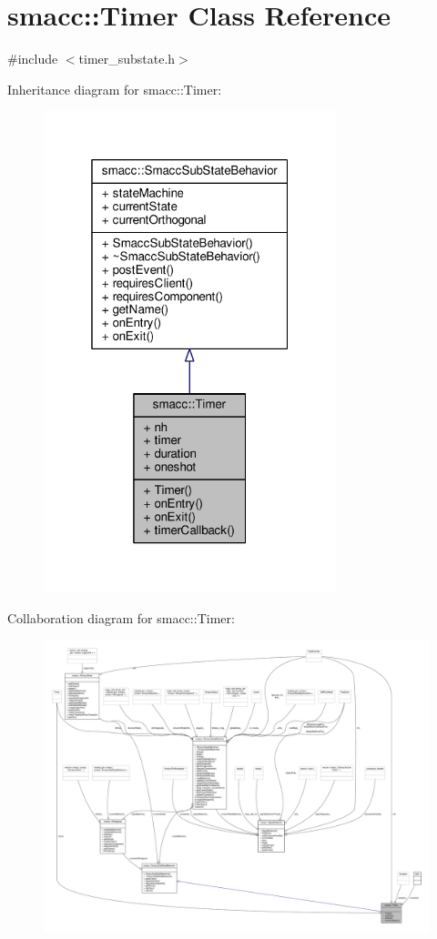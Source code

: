 \hypertarget{classsmacc_1_1Timer}{}\section{smacc\+:\+:Timer Class Reference}
\label{classsmacc_1_1Timer}


{\ttfamily \#include $<$timer\+\_\+substate.\+h$>$}



Inheritance diagram for smacc\+:\+:Timer\+:
\nopagebreak
\begin{figure}[H]
\begin{center}
\leavevmode
\includegraphics[width=241pt]{classsmacc_1_1Timer__inherit__graph}
\end{center}
\end{figure}


Collaboration diagram for smacc\+:\+:Timer\+:
\nopagebreak
\begin{figure}[H]
\begin{center}
\leavevmode
\includegraphics[width=350pt]{classsmacc_1_1Timer__coll__graph}
\end{center}
\end{figure}

